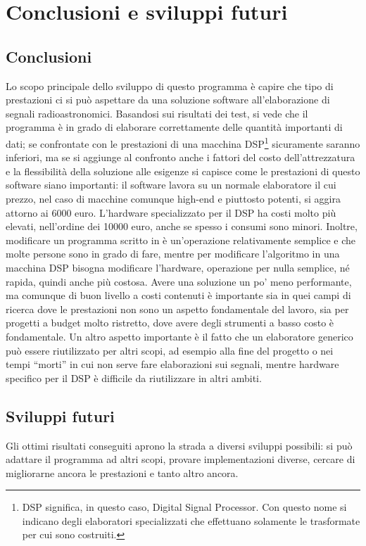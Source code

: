 \chapter{Conclusioni e sviluppi futuri}
\label{conclusions}
\section{Conclusioni}
Lo scopo principale dello sviluppo di questo programma \`e capire che tipo di
prestazioni ci si pu\`o aspettare da una soluzione software all'elaborazione di
segnali radioastronomici. Basandosi sui risultati dei test, si vede che il
programma \`e in grado di elaborare correttamente delle quantit\`a importanti di
dati; se confrontate con le prestazioni di una macchina DSP\footnote{DSP
    significa, in questo caso, Digital Signal Processor. Con questo nome si
    indicano degli elaboratori specializzati che effettuano solamente le
    trasformate per cui sono costruiti.} sicuramente saranno inferiori, ma se si
aggiunge al confronto anche i fattori del costo dell'attrezzatura e la
flessibilità della soluzione alle esigenze si capisce come le prestazioni di
questo software siano importanti: il software lavora su un normale elaboratore
il cui prezzo, nel caso di macchine comunque high-end e piuttosto potenti, si
aggira attorno ai 6000 euro. L'hardware specializzato per il DSP ha costi molto
pi\`u elevati, nell'ordine dei 10000 euro, anche se spesso i consumi sono
minori. Inoltre, modificare un programma scritto in \CC \`e un'operazione
relativamente semplice e che molte persone sono in grado di fare, mentre per
modificare l'algoritmo in una macchina DSP bisogna modificare l'hardware,
operazione per nulla semplice, n\'e rapida, quindi anche pi\`u costosa. Avere
una soluzione un po' meno performante, ma comunque di buon livello a costi
contenuti \`e importante sia in quei campi di ricerca dove le prestazioni non
sono un aspetto fondamentale del lavoro, sia per progetti a budget molto
ristretto, dove avere degli strumenti a basso costo \`e fondamentale.
Un altro aspetto importante \`e il fatto che un elaboratore generico pu\`o
essere riutilizzato per altri scopi, ad esempio alla fine del progetto o nei
tempi ``morti'' in cui non serve fare elaborazioni sui segnali, mentre hardware
specifico per il DSP \`e difficile da riutilizzare in altri ambiti.

\section{Sviluppi futuri}
Gli ottimi risultati conseguiti aprono la strada a diversi sviluppi possibili:
si può adattare il programma ad altri scopi, provare implementazioni diverse,
cercare di migliorarne ancora le prestazioni e tanto altro ancora.

